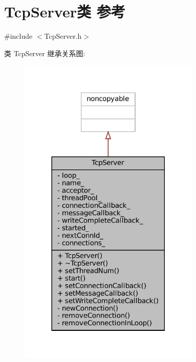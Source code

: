 \hypertarget{classmuduo_1_1TcpServer}{}\section{Tcp\+Server类 参考}
\label{classmuduo_1_1TcpServer}


{\ttfamily \#include $<$Tcp\+Server.\+h$>$}



类 Tcp\+Server 继承关系图\+:
\nopagebreak
\begin{figure}[H]
\begin{center}
\leavevmode
\includegraphics[width=245pt]{classmuduo_1_1TcpServer__inherit__graph}
\end{center}
\end{figure}


